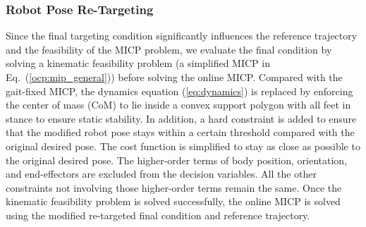 \subsubsection{Robot Pose Re-Targeting}
Since the final targeting condition significantly influences the reference trajectory and the feasibility of the MICP problem, we evaluate the final condition by solving a kinematic feasibility problem (a simplified MICP in Eq.~(\ref{ocp:mip_general})) before solving the online MICP. Compared with the gait-fixed MICP, the dynamics equation (\ref{eq:dynamics}) is replaced by enforcing the center of mass (CoM) to lie inside a convex support polygon with all feet in stance to ensure static stability. In addition, a hard constraint is added to ensure that the modified robot pose stays within a certain threshold compared with the original desired pose. The cost function is simplified to stay as close as possible to the original desired pose. The higher-order terms of body position, orientation, and end-effectors are excluded from the decision variables. All the other constraints not involving those higher-order terms remain the same. Once the kinematic feasibility problem is solved successfully, the online MICP is solved using the modified re-targeted final condition and reference trajectory.

